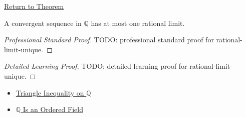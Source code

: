 \newpage
{}
\label{prf:rational-limit-unique}

\begin{remark*}[Return]
\hyperref[lem:rational-limit-unique]{Return to Theorem}
\end{remark*}

\begin{lemma*}
A convergent sequence in $\mathbb{Q}$ has at most one rational limit.
\end{lemma*}

\begin{proof}[Professional Standard Proof]
\LRAProofBodyStart
TODO: professional standard proof for rational-limit-unique.
\end{proof}

\begin{proof}[Detailed Learning Proof]
\LRAProofBodyStart
TODO: detailed learning proof for rational-limit-unique.
\end{proof}

\begin{remark*}
\end{remark*}

\begin{dependencies}
\begin{itemize}
  \item \hyperref[thm:triangle-inequality-on-q]{Triangle Inequality on $\mathbb{Q}$}
  \item \hyperref[thm:q-is-an-ordered-field]{$\mathbb{Q}$ Is an Ordered Field}
\end{itemize}
\end{dependencies}

\clearpage
